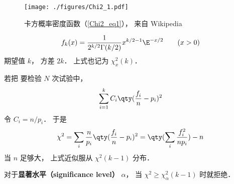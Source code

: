 
\begin{issues}
\issueDraft
\end{issues}

\begin{figure}[ht]
\centering
\texttt{[image: ./figures/Chi2\_1.pdf]}
\caption{卡方概率密度函数（\autoref{Chi2_eq1}）， 来自 Wikipedia} \label{Chi2_fig1}
\end{figure}

\begin{equation}\label{Chi2_eq1}
f_k(x) = \frac{1}{2^{k/2}\Gamma(k/2)}x^{k/2-1}\E^{-x/2} \qquad (x > 0)
\end{equation}
期望值 $k$， 方差 $2k$． 上式也记为 $\chi_x^2(k)$．


若把 要检验 $N$ 次试验中， 
\begin{equation}
\sum_{i=1}^k C_i \qty(\frac{f_i}{n} - p_i)^2
\end{equation}
令 $C_i = n/p_i$． 于是
\begin{equation}
\chi^2 = \sum_i \frac{n}{p_i} \qty(\frac{f_i}{n} - p_i)^2 = \qty(\sum_i \frac{f_i^2}{np_i}) - n
\end{equation}
当 $n$ 足够大， 上式近似服从 $\chi^2(k-1)$ 分布．

对于\textbf{显著水平（significance level）} $\alpha$， 当 $\chi^2 \geqslant \chi_\alpha^2(k-1)$ 时就拒绝．

